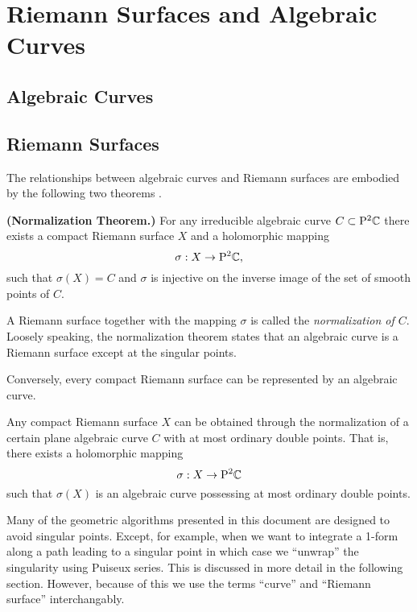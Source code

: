 \chapter*{Riemann Surfaces and Algebraic Curves}

\section{Algebraic Curves}

\section{Riemann Surfaces}

The relationships between algebraic curves and Riemann surfaces are embodied by
the following two theorems \cite{Griffiths89}.

\begin{theorem} \label{thm:normalization}
  {\bf (Normalization Theorem.)} For any irreducible algebraic curve $C
  \subset \mathrm{P}^2 \!\operatorname{\mathbb{C}}$ there exists a compact Riemann surface $X$ and
  a holomorphic mapping
  \[
      \sigma : X \to \mathrm{P}^2 \!\operatorname{\mathbb{C}},
  \]
  such that $\sigma( X ) = C$ and $\sigma$ is injective on the
  inverse image of the set of smooth points of $C$.
\end{theorem}

A Riemann surface together with the mapping $\sigma$ is called the {\it
  normalization of $C$}. Loosely speaking, the normalization theorem states
that an algebraic curve is a Riemann surface except at the singular points.

Conversely, every compact Riemann surface can be represented by an algebraic
curve.
\begin{theorem} \label{thm: repr-theorem}
  Any compact Riemann surface $X$ can be obtained through the normalization of
  a certain plane algebraic curve $C$ with at most ordinary double points. That
  is, there exists a holomorphic mapping
  \[
      \sigma : X \to \mathrm{P}^2 \!\operatorname{\mathbb{C}}
  \]
  such that $\sigma(X)$ is an algebraic curve possessing at most ordinary
  double points.
\end{theorem}
Many of the geometric algorithms presented in this document are designed to
avoid singular points. Except, for example, when we want to integrate a 1-form
along a path leading to a singular point in which case we ``unwrap'' the
singularity using Puiseux series. This is discussed in more detail in the
following section. However, because of this we use the terms ``curve'' and
``Riemann surface'' interchangably.
